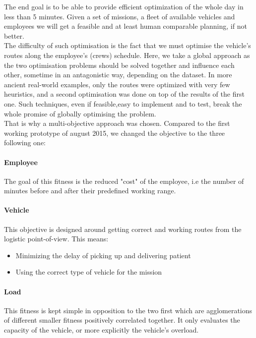 \documentclass[12pt]{memoir}
\begin{document}
\bigskip
The end goal is to be able to provide efficient optimization of the whole day in
less than 5 minutes. Given a set of missions, a fleet of available vehicles
and employees we will get a feasible and at least human comparable planning, if not
better. \\
The difficulty of such optimisation is the fact that we must optimise the vehicle's
routes along the employee's (crews) schedule. Here, we take a global approach as the
two optimisation problems should be solved together and influence each other,
sometime in an antagonistic way, depending on the dataset. In more ancient real-world examples,
only the routes were optimized with very few heuristics, and a second optimisation was done on top of the results
of the first one. Such techniques, even if feasible,easy to implement and to test,
break the whole promise of globally optimising the problem.\\
That is why a multi-objective approach was chosen. Compared to the first working prototype
of august 2015, we changed the objective to the three following one:

\paragraph{Employee} %
\label{par:Employee}
The goal of this fitness is the reduced "cost" of the employee, i.e the number of
minutes before and after their predefined working range.


\paragraph{Vehicle} %
\label{par:Vehicle}
This objective is designed around getting correct and working routes from the
logistic point-of-view. This means:
\begin{itemize}
  \item Minimizing the delay of picking up and delivering patient
  \item Using the correct type of vehicle for the mission
\end{itemize}

\paragraph{Load} %
This fitness is kept simple in opposition to the two first which are agglomerations
of different smaller fitness positively correlated together. It only
evaluates the capacity of the vehicle, or more explicitly the vehicle's overload.
\label{par:Load}
\end{document}
